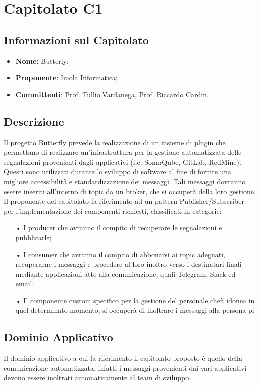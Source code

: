 \section{Capitolato C1}
\subsection{Informazioni sul Capitolato}
\begin{itemize}
	\item \textbf{Nome:} Butterly;
	\item \textbf{Proponente}: Imola Informatica;
	\item \textbf{Committenti}: Prof. Tullio Vardanega, Prof. Riccardo Cardin.
\end{itemize}

\subsection{Descrizione}
Il progetto Butterfly prevede la realizzazione di un insieme di plugin che permettano di realizzare un'infrastruttura per la gestione automatizzata delle segnalazioni provenienti dagli applicativi (i.e. SonarQube, GitLab, RedMine). Questi sono utilizzati durante lo sviluppo di software al fine di fornire una migliore accessibilità e standardizzazione dei messaggi. Tali messaggi dovranno essere inseriti all'interno di topic da un broker, che si occuperà della loro gestione. Il proponente del capitolato fa riferimento ad un pattern Publisher/Subscriber per l'implementazione dei componenti richiesti, classificati in categorie:
\begin{itemize}
\item[•]I producer che avranno il compito di recuperare le segnalazioni e pubblicarle;
\item[•] I consumer che avranno il compito di abbonarsi ai topic adeguati, recuperarne i messaggi e procedere al loro inoltro verso i destinatari finali mediante applicazioni atte alla comunicazione, quali Telegram, Slack ed email;
\item[•]Il componente custom specifico per la gestione del personale cheù idonea in quel determinato momento; si occuperà di inoltrare i messaggi alla persona pi
\end{itemize}
\subsection{Dominio Applicativo}
Il dominio applicativo a cui fa riferimento il capitolato proposto è quello della comunicazione automatizzata, infatti i messaggi provenienti dai vari applicativi devono essere inoltrati automaticamente al team di sviluppo.
